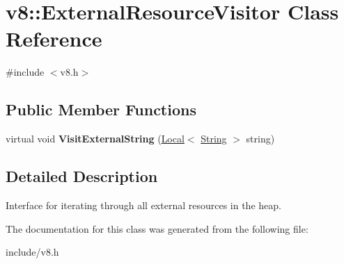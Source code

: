 \hypertarget{classv8_1_1_external_resource_visitor}{}\section{v8\+:\+:External\+Resource\+Visitor Class Reference}
\label{classv8_1_1_external_resource_visitor}


{\ttfamily \#include $<$v8.\+h$>$}

\subsection*{Public Member Functions}
\begin{DoxyCompactItemize}
\item 
virtual void {\bfseries Visit\+External\+String} (\hyperlink{classv8_1_1_local}{Local}$<$ \hyperlink{classv8_1_1_string}{String} $>$ string)\hypertarget{classv8_1_1_external_resource_visitor_ad611b1b6a06753f8eaf6936f793441bd}{}\label{classv8_1_1_external_resource_visitor_ad611b1b6a06753f8eaf6936f793441bd}

\end{DoxyCompactItemize}


\subsection{Detailed Description}
Interface for iterating through all external resources in the heap. 

The documentation for this class was generated from the following file\+:\begin{DoxyCompactItemize}
\item 
include/v8.\+h\end{DoxyCompactItemize}
